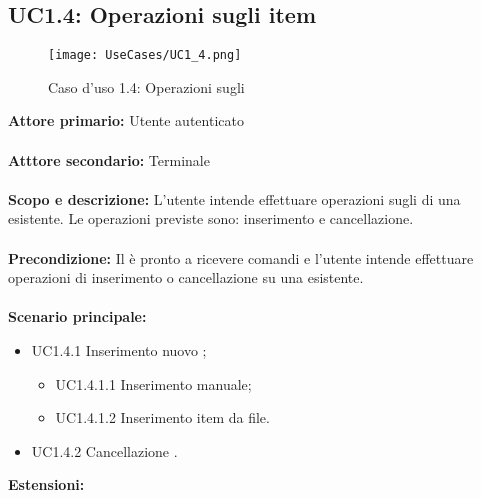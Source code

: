 \documentclass{scalatekids-article}
\begin{document}
\subsection{UC1.4: Operazioni sugli item}
\begin{figure}[H]
  \begin{center}
    \texttt{[image: UseCases/UC1\_4.png]}
    \caption*{Caso d'uso 1.4: Operazioni sugli }
  \end{center}
\end{figure}
\textbf{Attore primario:} Utente autenticato\\ \\
\textbf{Atttore secondario:} Terminale\\ \\
\textbf{Scopo e descrizione:} L'utente intende effettuare operazioni sugli  di una  esistente. Le operazioni previste sono:
inserimento e cancellazione.\\ \\
\textbf{Precondizione:} Il  è pronto a ricevere comandi e l'utente intende effettuare operazioni di inserimento o cancellazione su una  esistente.\\ \\
\textbf{Scenario principale:}
\begin{itemize}
  \item UC1.4.1 Inserimento nuovo ;
  \begin{itemize}
    \item UC1.4.1.1 Inserimento  manuale;
    \item UC1.4.1.2 Inserimento  item da file.
  \end{itemize}
  \item UC1.4.2 Cancellazione .
\end{itemize}
\textbf{Estensioni:}
\end{document}
